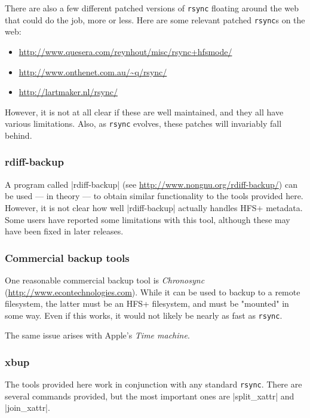 \documentclass[11pt]{article}
\begin{document}
There are also 
a few different patched
versions of \texttt{rsync} 
floating around the web that could do the job, more or less.
Here are some relevant patched \texttt{rsync}s on the web:
\begin{itemize}
\item
   \url{http://www.quesera.com/reynhout/misc/rsync+hfsmode/}
\item
   \url{http://www.onthenet.com.au/~q/rsync/}
\item
   \url{http://lartmaker.nl/rsync/}
\end{itemize}

However, it is not at all clear if these are well maintained, and they all have
various limitations.  Also, as \texttt{rsync} evolves, these patches will invariably
fall behind.


\subsubsection{rdiff-backup}

A program called |rdiff-backup| 
(see \url{http://www.nongnu.org/rdiff-backup/})
can be used --- in theory --- to obtain similar functionality
to the tools provided here.
However, it is not clear how well |rdiff-backup|
actually handles HFS+ metadata.
Some users have reported some limitations with this tool,
although these may have been fixed in later releases.



\subsubsection{Commercial backup tools}

One reasonable commercial backup tool is \emph{Chronosync}
(\url{http://www.econtechnologies.com}).  
While it can be used to backup to a remote
filesystem, the latter must be an HFS+ filesystem,
and must be "mounted" in some way.  Even if
this works, it would not likely be nearly as fast as \texttt{rsync}.

The same issue arises with Apple's {\em Time machine}.


\subsubsection{xbup}
\label{xbup-intro}

The tools provided here work in conjunction with any standard \texttt{rsync}.   
There
are several commands provided, but the most important ones are |split_xattr| and
|join_xattr|.
\end{document}

